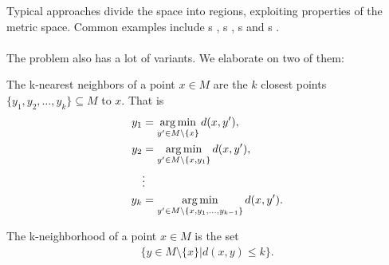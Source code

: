	Typical approaches divide the space into regions, exploiting properties of the metric space.
	Common examples include {\kdTree}s , {\vpTree}s ,
	{\bkTree}s  and {\coverTree}s .\\\\
	The problem also has a lot of variants. We elaborate on two of them:
	\begin{mydef}\label{kNearestNeighborsDef}
		The \textnormal{k-nearest neighbors} of a point $x \in M$ are the
		$k$ closest points $\{y_1, y_2, \ldots, y_k\} \subseteq M$ to $x$. That is
		\begin{align*}
			y_1	&= \operatorname*{arg\,min}_{y' \in M \setminus \{x\}} d(x, y'),\\
			y_2	&= \operatorname*{arg\,min}_{y' \in M \setminus \{x, y_1\}} d(x, y'),\\
				&\vdots\\
			y_k	&= \operatorname*{arg\,min}_{y' \in M \setminus \{x, y_1, \ldots, y_{k - 1}\}} d(x, y').
		\end{align*}
	\end{mydef}
	\begin{mydef}
		The \textnormal{k-neighborhood} of a point $x \in M$ is the set
		\begin{align*}
			\{y \in M \setminus \{x\} | d(x, y) \le k\}.
		\end{align*}
	\end{mydef}

